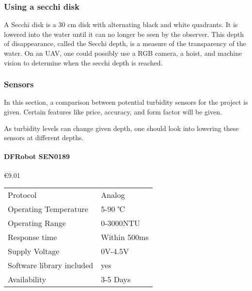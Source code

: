\subsubsection{Using a secchi disk}
A Secchi disk is a 30 cm disk with alternating black and white quadrants. It is lowered into the water until it can no longer be seen by the observer. This depth of disappearance, called the Secchi depth, is a measure of the transparency of the water. On an UAV, one could possibly use a RGB camera, a hoist, and machine vision to determine when the secchi depth is reached. \cite{secchidisk}

\newpage
\subsubsection{Sensors}
In this section, a comparison between potential turbidity sensors for the project is given. Certain features like price, accuracy, and form factor will be given.

As turbidity levels can change given depth, one should look into lowering these sensors at different depths.

\paragraph{DFRobot SEN0189}\mbox{€9.01} \cite{SEN0189}
\begin{table}[h!]
	\centering
	\quad
	\begin{tabular}{| l | l |}
    \hline
    Protocol & Analog\\
    Operating Temperature & 5-90 ℃ \\
    Operating Range &  0-3000NTU\\
    Response time & Within 500ms \\
    Supply Voltage & 0V-4.5V \\
    Software library included & yes \\
    Availability & 3-5 Days \\
    \hline
	\end{tabular}
\end{table}


